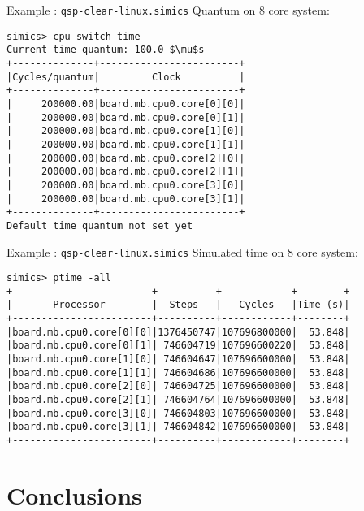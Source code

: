 \begin{frame}[fragile]{Example : \texttt{qsp-clear-linux.simics}}
Quantum on 8 core system:
\begin{lstlisting}[mathescape=true,keywordstyle=\ttfamily]
simics> cpu-switch-time
Current time quantum: 100.0 $\mu$s
+--------------+------------------------+
|Cycles/quantum|         Clock          |
+--------------+------------------------+
|     200000.00|board.mb.cpu0.core[0][0]|
|     200000.00|board.mb.cpu0.core[0][1]|
|     200000.00|board.mb.cpu0.core[1][0]|
|     200000.00|board.mb.cpu0.core[1][1]|
|     200000.00|board.mb.cpu0.core[2][0]|
|     200000.00|board.mb.cpu0.core[2][1]|
|     200000.00|board.mb.cpu0.core[3][0]|
|     200000.00|board.mb.cpu0.core[3][1]|
+--------------+------------------------+
Default time quantum not set yet
\end{lstlisting}
\end{frame}

\begin{frame}[fragile]{Example : \texttt{qsp-clear-linux.simics}}
Simulated time on 8 core system:
\begin{verbatim}
simics> ptime -all
+------------------------+----------+------------+--------+
|       Processor        |  Steps   |   Cycles   |Time (s)|
+------------------------+----------+------------+--------+
|board.mb.cpu0.core[0][0]|1376450747|107696800000|  53.848|
|board.mb.cpu0.core[0][1]| 746604719|107696600220|  53.848|
|board.mb.cpu0.core[1][0]| 746604647|107696600000|  53.848|
|board.mb.cpu0.core[1][1]| 746604686|107696600000|  53.848|
|board.mb.cpu0.core[2][0]| 746604725|107696600000|  53.848|
|board.mb.cpu0.core[2][1]| 746604764|107696600000|  53.848|
|board.mb.cpu0.core[3][0]| 746604803|107696600000|  53.848|
|board.mb.cpu0.core[3][1]| 746604842|107696600000|  53.848|
+------------------------+----------+------------+--------+
\end{verbatim}
\end{frame}

\section*{Conclusions}

